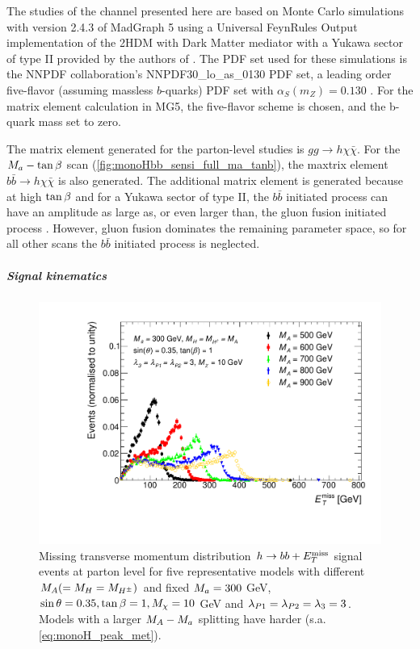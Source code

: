 The studies of the \monohbb channel presented here are based on Monte Carlo simulations with version 2.4.3 of MadGraph 5 \cite{Alwall:2014hca} using a 
Universal FeynRules Output \cite{Degrande:2011ua} implementation of the 2HDM with Dark Matter mediator with a Yukawa sector of type II provided by the authors of \cite{Bauer:2017ota}.
The PDF set used for these simulations is the NNPDF  collaboration's NNPDF30\_lo\_as\_0130 PDF set,
 a leading order five-flavor (assuming massless $b$-quarks) PDF set with $\alpha_{S}(m_{Z}) = 0.130$ \cite{Ball:2014uwa}.
For the matrix element calculation in MG5, the five-flavor scheme is chosen, and the b-quark mass set to zero.

The matrix element generated for the parton-level studies is $ g g \rightarrow h  \chi \bar{\chi}$. %
For the $M_{a}-\tan\beta$ scan (\autoref{fig:monoHbb_sensi_full_ma_tanb}), the maxtrix element $b \bar{b} \rightarrow h  \chi \bar{\chi}$ is also generated.
The additional matrix element is generated because at high $\tan\beta$ and for a Yukawa sector of type II,
the $b \bar{b}$ initiated process can have an amplitude as large as, or even larger than, the gluon fusion initiated process \cite{Bauer:2017ota}.
However, gluon fusion dominates the remaining parameter space, so for all other scans the $b\bar{b}$ initiated process is neglected.

\subparagraph{Signal kinematics}

\begin{figure}[tbp]
\centering
\includegraphics[width=\textwidth]{texinputs/04_grid/figures/monoHbb_m_large_A_scan_MET_liny_norm2one.pdf}
\caption[$\MET$ distribution in $h\rightarrow bb + \MET$ events for different $\mA$]
{
Missing transverse momentum distribution $h\rightarrow bb + \MET$ signal events at parton level for five representative models with different $M_{A}(=M_{H}=M_{H^{\pm}})$
and fixed $M_{a} = 300$ GeV, $ \sin\theta = 0.35, \tan\beta = 1, M_{\chi} = 10$ GeV and $ \lambda_{P1} = \lambda_{P2} = \lambda_{3} = 3 $. 
Models with a larger $M_{A}-M_{a}$ splitting have harder \met (s.a.  \autoref{eq:monoH_peak_met}). 
%
}
\label{fig:monoHbb_mA_scan_met}
\end{figure}

